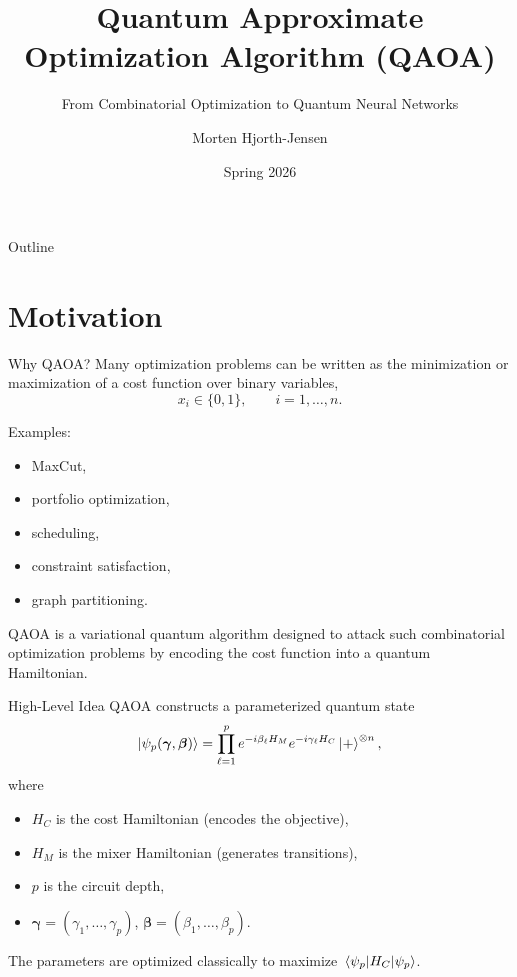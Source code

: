 \documentclass[aspectratio=169]{beamer}
\title{Quantum Approximate Optimization Algorithm (QAOA)}
\subtitle{From Combinatorial Optimization to Quantum Neural Networks}
\author{Morten Hjorth-Jensen}
\date{Spring 2026}
\begin{document}
\frame{\titlepage}

\begin{frame}{Outline}
\tableofcontents
\end{frame}

\section{Motivation}

\begin{frame}{Why QAOA?}
Many optimization problems can be written as the minimization or maximization of a
cost function over binary variables,
\[
x_i \in \{0,1\}, \qquad i=1,\dots,n.
\]

Examples:
\begin{itemize}
    \item MaxCut,
    \item portfolio optimization,
    \item scheduling,
    \item constraint satisfaction,
    \item graph partitioning.
\end{itemize}

QAOA is a variational quantum algorithm designed to attack such combinatorial
optimization problems by encoding the cost function into a quantum Hamiltonian.
\end{frame}

\begin{frame}{High-Level Idea}
QAOA constructs a parameterized quantum state
\[
\ket{\psi_p(\bm{\gamma},\bm{\beta})}
=
\prod_{\ell=1}^p e^{-i\beta_\ell H_M} e^{-i\gamma_\ell H_C}\ket{+}^{\otimes n},
\]
where
\begin{itemize}
    \item \(H_C\) is the cost Hamiltonian (encodes the objective),
    \item \(H_M\) is the mixer Hamiltonian (generates transitions),
    \item \(p\) is the circuit depth,
    \item \(\bm{\gamma}=(\gamma_1,\dots,\gamma_p)\), \(\bm{\beta}=(\beta_1,\dots,\beta_p)\).
\end{itemize}

The parameters are optimized classically to maximize \(\ev{H_C}{\psi_p}\).
\end{frame}
\end{document}
